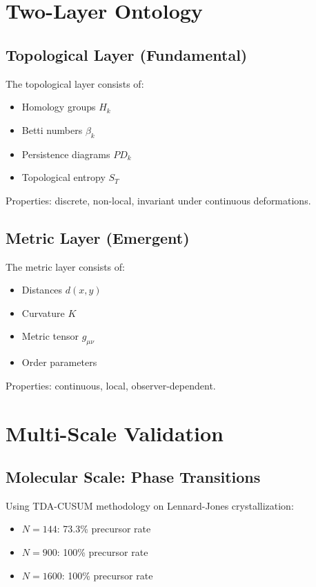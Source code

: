 \documentclass[aps,pre,twocolumn,superscriptaddress]{revtex4-2}
\begin{document}
\section{Two-Layer Ontology}

\subsection{Topological Layer (Fundamental)}

The topological layer consists of:
\begin{itemize}
\item Homology groups $H_k$
\item Betti numbers $\beta_k$
\item Persistence diagrams $PD_k$
\item Topological entropy $S_T$
\end{itemize}

Properties: discrete, non-local, invariant under continuous deformations.

\subsection{Metric Layer (Emergent)}

The metric layer consists of:
\begin{itemize}
\item Distances $d(x,y)$
\item Curvature $K$
\item Metric tensor $g_{\mu\nu}$
\item Order parameters
\end{itemize}

Properties: continuous, local, observer-dependent.

\section{Multi-Scale Validation}

\subsection{Molecular Scale: Phase Transitions}

Using TDA-CUSUM methodology on Lennard-Jones crystallization:
\begin{itemize}
\item $N = 144$: 73.3\% precursor rate
\item $N = 900$: 100\% precursor rate
\item $N = 1600$: 100\% precursor rate
\end{itemize}
\end{document}
